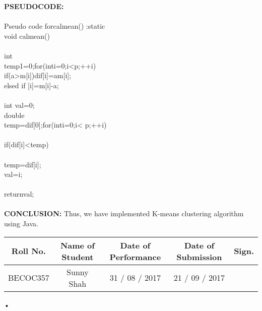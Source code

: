 \documentclass[11pt]{article}
\begin{document}
	
	\noindent \textbf{ PSEUDOCODE: } \\ \\
	Pseudo code forcalmean() :static \\
	void calmean() \\
	{ \\
		int \\
		temp1=0;for(inti=0;i<p;++i) \\
		{
			if(a>m[i])dif[i]=am[i]; \\
			elsed if [i]=m[i]-a; \\
		} \\
		int val=0; \\
		double \\
		temp=dif[0];for(inti=0;i< p;++i) \\
		{ \\
			if(dif[i]<temp) \\
			{ \\
				temp=dif[i]; \\
				val=i; \\
		}} \\
		returnval; \\
	}\\
	
	\noindent \textbf{ CONCLUSION:}
	Thus, we have implemented K-means clustering algorithm using Java.
	
	\begin{center}
		\begin{tabular}{|c|c|c|c|c|}
			\hline
			
			{\bf Roll No.}		&{\bf Name of Student}	&{\bf Date of Performance}  				&{\bf Date of Submission}	&{\bf Sign.}  \\    \hline
			BECOC357	& Sunny Shah  & 31 / 08 / 2017		& 21 / 09 / 2017		&  \\ \hline
		\end{tabular}•
	\end{center}
	
\end{document}
